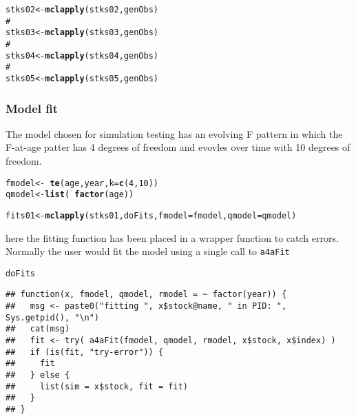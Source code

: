 \documentclass[a4paper]{article}\usepackage{graphicx, color}
\makeatletter
\newcommand{\hlfunctioncall}[1]{\textcolor[rgb]{0.501960784313725,0,0.329411764705882}{\textbf{#1}}}%
\newcommand{\hlcomment}[1]{\textcolor[rgb]{0.180392156862745,0.6,0.341176470588235}{#1}}%
\newenvironment{kframe}{%
 \def\at@end@of@kframe{}%
 \ifinner\ifhmode%
  \def\at@end@of@kframe{\end{minipage}}%
  \begin{minipage}{\columnwidth}%
 \fi\fi%
 \def\FrameCommand##1{\hskip\@totalleftmargin \hskip-\fboxsep
 \colorbox{shadecolor}{##1}\hskip-\fboxsep
     \hskip-\linewidth \hskip-\@totalleftmargin \hskip\columnwidth}%
 \MakeFramed {\advance\hsize-\width
   \@totalleftmargin\z@ \linewidth\hsize
   \@setminipage}}%
 {\par\unskip\endMakeFramed%
 \at@end@of@kframe}
\newenvironment{knitrout}{}{} %
\makeatother
\begin{document}
\begin{knitrout}
\color{fgcolor}\begin{kframe}
\begin{alltt}
stks02 <- \hlfunctioncall{mclapply}(stks02, genObs)
\hlcomment{#}
stks03 <- \hlfunctioncall{mclapply}(stks03, genObs)
\hlcomment{#}
stks04 <- \hlfunctioncall{mclapply}(stks04, genObs)
\hlcomment{#}
stks05 <- \hlfunctioncall{mclapply}(stks05, genObs)
\end{alltt}
\end{kframe}
\end{knitrout}


\subsubsection*{Model fit}

The model chosen for simulation testing has an evolving F pattern in which the F-at-age patter has 4 degrees of freedom and evovles over time with 10 degrees of freedom.

\begin{knitrout}
\color{fgcolor}\begin{kframe}
\begin{alltt}
fmodel <- ~\hlfunctioncall{te}(age, year, k = \hlfunctioncall{c}(4, 10))
qmodel <- \hlfunctioncall{list}(~\hlfunctioncall{factor}(age))
\end{alltt}
\end{kframe}
\end{knitrout}


\begin{knitrout}
\color{fgcolor}\begin{kframe}
\begin{alltt}
fits01 <- \hlfunctioncall{mclapply}(stks01, doFits, fmodel = fmodel, qmodel = qmodel)
\end{alltt}
\end{kframe}
\end{knitrout}


here the fitting function has been placed in a wrapper function to catch errors.  Normally the user would fit the model using a single call to \verb|a4aFit|
\begin{knitrout}
\color{fgcolor}\begin{kframe}
\begin{alltt}
doFits
\end{alltt}
\begin{verbatim}
## function(x, fmodel, qmodel, rmodel = ~ factor(year)) {
##   msg <- paste0("fitting ", x$stock@name, " in PID: ", Sys.getpid(), "\n")   
##   cat(msg)
##   fit <- try( a4aFit(fmodel, qmodel, rmodel, x$stock, x$index) )
##   if (is(fit, "try-error")) {
##     fit 
##   } else {
##     list(sim = x$stock, fit = fit)
##   }
## }
\end{verbatim}
\end{kframe}
\end{knitrout}
\end{document}

